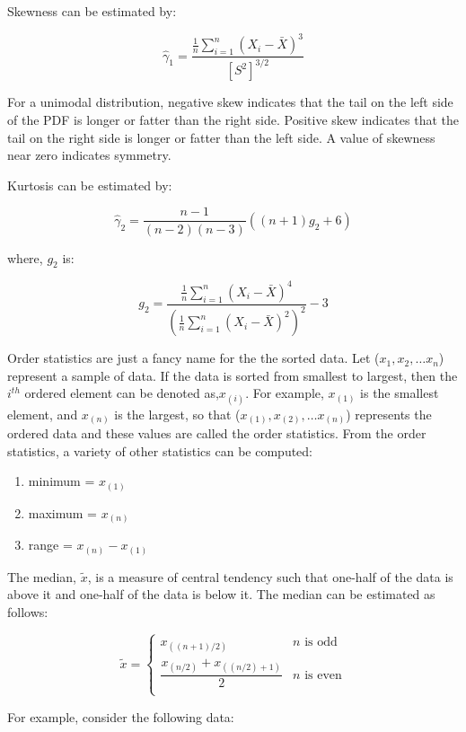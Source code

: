 \documentclass[
]{book}
\theoremstyle{definition}
\theoremstyle{definition}
\theoremstyle{definition}
\theoremstyle{definition}
\theoremstyle{remark}
\begin{document}
Skewness can be estimated by:

\[\hat{\gamma}_{1} = \frac{\frac{1}{n}\sum\nolimits_{i=1}^{n}\left(X_i - \bar{X}\right)^3}{\left[S^2\right]^{3/2}}\]

For a unimodal distribution, negative skew indicates that the tail on
the left side of the PDF is longer or fatter than the right side.
Positive skew indicates that the tail on the right side is longer or
fatter than the left side. A value of skewness near zero indicates
symmetry.

Kurtosis can be estimated by:

\[\hat{\gamma}_{2} = \frac{n-1}{(n-2)(n-3)}\left((n+1) g_{2} +6\right)\]

where, \(g_{2}\) is:

\[g_{2} = \frac{\frac{1}{n}\sum\nolimits_{i=1}^{n}\left(X_i - \bar{X}\right)^4}{\left(\frac{1}{n}\sum\nolimits_{i=1}^{n}\left(X_i - \bar{X}\right)^2\right)^2} -3\]

Order statistics are just a fancy name for the the sorted data. Let
(\(x_1, x_2, \ldots x_n\)) represent a sample of data. If the data is
sorted from smallest to largest, then the \(i^{th}\) ordered element can
be denoted as,\(x_{(i)}\). For example, \(x_{(1)}\) is the smallest element,
and \(x_{(n)}\) is the largest, so that
(\(x_{(1)}, x_{(2)}, \ldots x_{(n)}\)) represents the ordered data and
these values are called the order statistics. From the order statistics,
a variety of other statistics can be computed:

\begin{enumerate}
\def\labelenumi{\arabic{enumi}.}
\item
  minimum = \(x_{(1)}\)
\item
  maximum = \(x_{(n)}\)
\item
  range = \(x_{(n)} - x_{(1)}\)
\end{enumerate}

The median, \(\tilde{x}\), is a measure of central tendency such that
one-half of the data is above it and one-half of the data is below it.
The median can be estimated as follows:

\[\tilde{x} =
\begin{cases}
x_{((n + 1)/2)} & n \text{ is odd}\\
\dfrac{x_{(n/2)} + x_{((n/2) + 1)}}{2} & n \text{ is even}\\
\end{cases}\]

For example, consider the following data:
\end{document}
